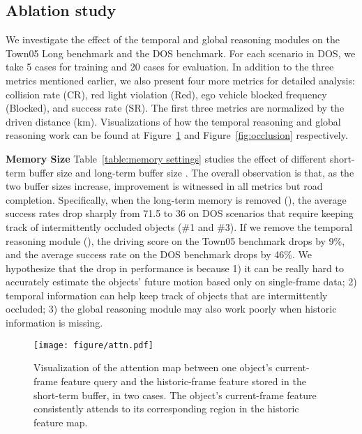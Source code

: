 \documentclass[10pt,twocolumn,letterpaper]{article}
\begin{document}
\subsection{Ablation study}
We investigate the effect of the temporal and global reasoning modules on the Town05 Long benchmark and the DOS benchmark.
For each scenario in DOS, we take 5 cases for training and 20 cases for evaluation. In addition to the three metrics mentioned earlier, we also present four more metrics for detailed analysis: collision rate (CR), red light violation (Red), ego vehicle blocked frequency (Blocked), and success rate (SR). The first three metrics are normalized by the driven distance (km). Visualizations of how the temporal reasoning and global reasoning work can be found at Figure~\ref{fig:mem attn} and Figure~\ref{fig:occlusion} respectively.



\noindent\textbf{Memory Size} Table~\ref{table:memory settings} studies the effect of different short-term buffer size  and long-term buffer size . The overall observation is that, as the two buffer sizes increase, improvement is witnessed in all metrics but road completion. Specifically, when the long-term memory is removed (), the average success rates drop sharply from 71.5 to 36 on DOS scenarios that require keeping track of intermittently occluded objects (\#1 and \#3). If we remove the temporal reasoning module (), the driving score on the Town05 benchmark drops by 9\%, and the average success rate on the DOS benchmark drops by 46\%. We hypothesize that the drop in performance is because 1) it can be really hard to accurately estimate the objects' future motion based only on single-frame data; 2) temporal information can help keep track of objects that are intermittently occluded; 3) the global reasoning module may also work poorly when historic information is missing.




\begin{figure}[]
    \centering
    \texttt{[image: figure/attn.pdf]}
        \vspace{-0.5em}
    \caption{Visualization of the attention map between one object's current-frame feature query and the historic-frame feature stored in the short-term buffer, in two cases. The object's current-frame feature consistently attends to its corresponding region in the historic feature map.}
    \label{fig:mem attn}
    \vspace{-1em}
\end{figure}
\end{document}
